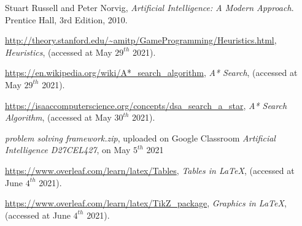 \documentclass{article}
\begin{document}
\begin{thebibliography}{9}

	  Stuart Russell and Peter Norvig,
	  \emph{Artificial Intelligence: A Modern Approach}.
	  Prentice Hall,
	  3rd Edition,
	  2010.

	 \url{http://theory.stanford.edu/~amitp/GameProgramming/Heuristics.html},
	  \emph{Heuristics},
	   (accessed at May $29^{th}$ 2021).

	 \url{https://en.wikipedia.org/wiki/A*_search_algorithm},
	  \emph{A* Search},
	   (accessed at May $29^{th}$ 2021).
	   
	   
	 \url{https://isaaccomputerscience.org/concepts/dsa_search_a_star},
	  \emph{A* Search Algorithm},
	   (accessed at May $30^{th}$ 2021).
	 
	  \emph{problem \textunderscore solving \textunderscore framework.zip}, uploaded on Google Classroom \emph{Artificial Intelligence D27CEL427}, on May $5^{th}$ 2021
	  
	 \url{https://www.overleaf.com/learn/latex/Tables},
	  \emph{Tables in \LaTeX },
	   (accessed at June $4^{th}$ 2021). 
	   
	 \url{https://www.overleaf.com/learn/latex/TikZ_package},
	  \emph{Graphics in \LaTeX },
	   (accessed at June $4^{th}$ 2021). 
	   
\end{thebibliography}
\end{document}
